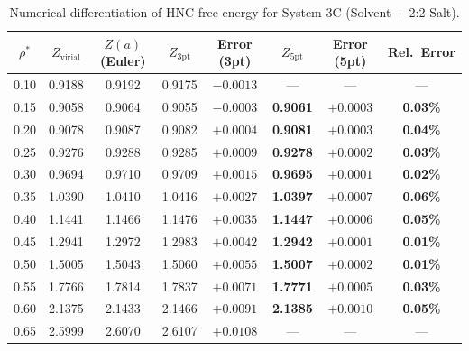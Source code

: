 \documentclass[11pt,a4paper]{article}
\begin{document}
\begin{table}[htbp]
\centering
\caption{Numerical differentiation of HNC free energy for System 3C (Solvent + 2:2 Salt).}
\label{tab:diff_3c}
\small
\begin{tabular}{cccccccc}
\toprule
$\rho^*$ & $Z_{\text{virial}}$ & $Z(a)$ (Euler) & $Z_{\text{3pt}}$ & Error (3pt) & $Z_{\text{5pt}}$ & Error (5pt) & Rel.~Error \\
\midrule
0.10 & 0.9188 & 0.9192 & 0.9175 & $-0.0013$ & — & — & — \\
0.15 & 0.9058 & 0.9064 & 0.9055 & $-0.0003$ & \textbf{0.9061} & $+0.0003$ & \textbf{0.03\%} \\
0.20 & 0.9078 & 0.9087 & 0.9082 & $+0.0004$ & \textbf{0.9081} & $+0.0003$ & \textbf{0.04\%} \\
0.25 & 0.9276 & 0.9288 & 0.9285 & $+0.0009$ & \textbf{0.9278} & $+0.0002$ & \textbf{0.03\%} \\
0.30 & 0.9694 & 0.9710 & 0.9709 & $+0.0015$ & \textbf{0.9695} & $+0.0001$ & \textbf{0.02\%} \\
0.35 & 1.0390 & 1.0410 & 1.0416 & $+0.0027$ & \textbf{1.0397} & $+0.0007$ & \textbf{0.06\%} \\
0.40 & 1.1441 & 1.1466 & 1.1476 & $+0.0035$ & \textbf{1.1447} & $+0.0006$ & \textbf{0.05\%} \\
0.45 & 1.2941 & 1.2972 & 1.2983 & $+0.0042$ & \textbf{1.2942} & $+0.0001$ & \textbf{0.01\%} \\
0.50 & 1.5005 & 1.5043 & 1.5060 & $+0.0055$ & \textbf{1.5007} & $+0.0002$ & \textbf{0.01\%} \\
0.55 & 1.7766 & 1.7814 & 1.7837 & $+0.0071$ & \textbf{1.7771} & $+0.0005$ & \textbf{0.03\%} \\
0.60 & 2.1375 & 2.1433 & 2.1466 & $+0.0091$ & \textbf{2.1385} & $+0.0010$ & \textbf{0.05\%} \\
0.65 & 2.5999 & 2.6070 & 2.6107 & $+0.0108$ & — & — & — \\
\bottomrule
\end{tabular}
\end{table}
\end{document}
